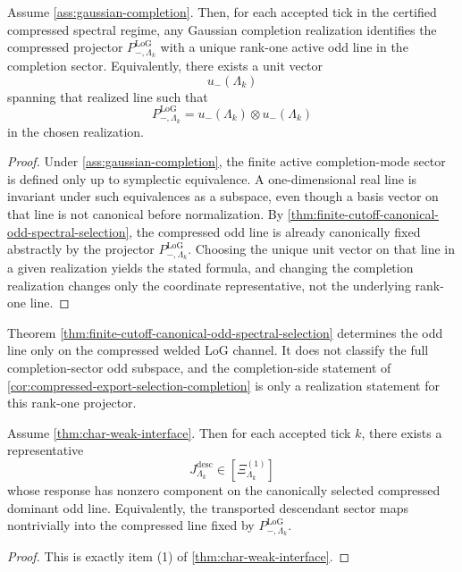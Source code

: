\documentclass[11pt]{article}
\begin{document}
\begin{corollary}
\label{cor:compressed-export-selection-completion}
Assume \cref{ass:gaussian-completion}. Then, for each accepted tick in the certified compressed
spectral regime, any Gaussian completion realization identifies the compressed projector
\(
P_{-,\Lambda_k}^{\mathrm{LoG}}
\)
with a unique rank-one active odd line in the completion sector. Equivalently, there exists a unit
vector
\[
u_-(\Lambda_k)
\]
spanning that realized line such that
\[
P_{-,\Lambda_k}^{\mathrm{LoG}}
=
u_-(\Lambda_k)\otimes u_-(\Lambda_k)
\]
in the chosen realization.
\end{corollary}

\begin{proof}
Under \cref{ass:gaussian-completion}, the finite active completion-mode sector is defined only up to
symplectic equivalence. A one-dimensional real line is invariant under such equivalences as a subspace,
even though a basis vector on that line is not canonical before normalization. By
\cref{thm:finite-cutoff-canonical-odd-spectral-selection}, the compressed odd line is already
canonically fixed abstractly by the projector \(P_{-,\Lambda_k}^{\mathrm{LoG}}\). Choosing the unique
unit vector on that line in a given realization yields the stated formula, and changing the completion
realization changes only the coordinate representative, not the underlying rank-one line.
\end{proof}

\begin{remark}
\label{rem:compressed-spectral-scope}
Theorem \cref{thm:finite-cutoff-canonical-odd-spectral-selection} determines the odd line only on
the compressed welded LoG channel. It does not classify the full completion-sector odd subspace, and
the completion-side statement of \cref{cor:compressed-export-selection-completion} is only a
realization statement for this rank-one projector.
\end{remark}

\begin{corollary}
\label{cor:compressed-transport-hit}
Assume \cref{thm:char-weak-interface}. Then for each accepted tick \(k\), there exists a
representative
\[
J^{\mathrm{desc}}_{\Lambda_k}\in[\Xi^{(1)}_{\Lambda_k}]
\]
whose response has nonzero component on the canonically selected compressed dominant odd line.
Equivalently, the transported descendant sector maps nontrivially into the compressed line fixed by
\(
P_{-,\Lambda_k}^{\mathrm{LoG}}
\).
\end{corollary}

\begin{proof}
This is exactly item (1) of \cref{thm:char-weak-interface}.
\end{proof}

\ifdefined\UOMTransportFragmentLoaded\else
\end{document}
